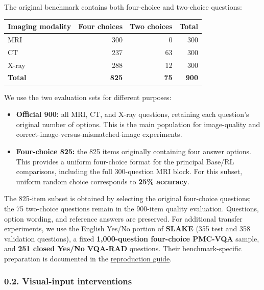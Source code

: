 \documentclass[
  10pt,
  a4paper,
]{article}
\newcounter{none} %
\providecommand{\tightlist}{%
  \setlength{\itemsep}{0pt}\setlength{\parskip}{0pt}}
\begin{document}
The original benchmark contains both four-choice and two-choice
questions:

{\def\LTcaptype{none} %
\begin{longtable}[]{@{}lrrr@{}}
\toprule\noalign{}
Imaging modality & Four choices & Two choices & Total \\
\midrule\noalign{}
\endhead
\bottomrule\noalign{}
\endlastfoot
MRI & 300 & 0 & 300 \\
CT & 237 & 63 & 300 \\
X-ray & 288 & 12 & 300 \\
\textbf{Total} & \textbf{825} & \textbf{75} & \textbf{900} \\
\end{longtable}
}

We use the two evaluation sets for different purposes:

\begin{itemize}
\tightlist
\item
  \textbf{Official 900:} all MRI, CT, and X-ray questions, retaining
  each question's original number of options. This is the main
  population for image-quality and correct-image-versus-mismatched-image
  experiments.
\item
  \textbf{Four-choice 825:} the 825 items originally containing four
  answer options. This provides a uniform four-choice format for the
  principal Base/RL comparisons, including the full 300-question MRI
  block. For this subset, uniform random choice corresponds to
  \textbf{25\% accuracy}.
\end{itemize}

The 825-item subset is obtained by selecting the original four-choice
questions; the 75 two-choice questions remain in the 900-item quality
evaluation. Questions, option wording, and reference answers are
preserved. For additional transfer experiments, we use the English
Yes/No portion of \textbf{SLAKE} (355 test and 358 validation
questions), a fixed \textbf{1,000-question four-choice PMC-VQA} sample,
and \textbf{251 closed Yes/No VQA-RAD} questions. Their
benchmark-specific preparation is documented in the
\href{https://github.com/bbuller591-sketch/medical-vlm-visual-reliance/blob/main/docs/REPRODUCE_FROM_SCRATCH.md}{reproduction
guide}.

\subsubsection{0.2. Visual-input
interventions}\label{visual-input-interventions}
\end{document}
